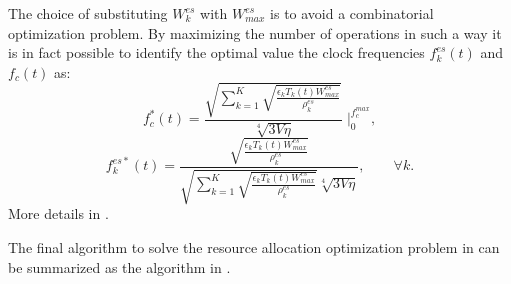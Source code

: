 \begin{itemize}[label={}]
    The choice of substituting $W_k^{es}$ with $W_{max}^{es}$ is to avoid a combinatorial optimization problem. By maximizing the number of operations in such a way it is in fact possible to identify the optimal value the clock frequencies $f_k^{es}(t)$ and $f_c(t)$ as:
    \begin{equation}
        f_c^{*} (t) = \frac{\sqrt{\sum_{k=1}^K \sqrt{\frac{\epsilon_k T_k(t)W_{max}^{es}}{\rho_k^{es}}}}}{\sqrt[4]{3V\eta}} \; \Biggr|_0^{f_{c}^{max}},
    \label{eq: EN_ib optimal freq device ES}    
    \end{equation} 
    \begin{equation}
        f_k^{es*}(t) = \frac{\sqrt{\frac{\epsilon_k T_k(t)W_{max}^{es}}{\rho_k^{es}}}}{\sqrt{\sum_{k=1}^K \sqrt{\frac{\epsilon_k T_k(t)W_{max}^{es}}{\rho_k^{es}}}}\sqrt[4]{3V\eta} },  \qquad \forall k.
    \label{eq: EN_ib optimal freq ES}    
    \end{equation}
    More details in .

\end{itemize}

The final algorithm to solve the resource allocation optimization problem in  can be summarized as the algorithm in .


